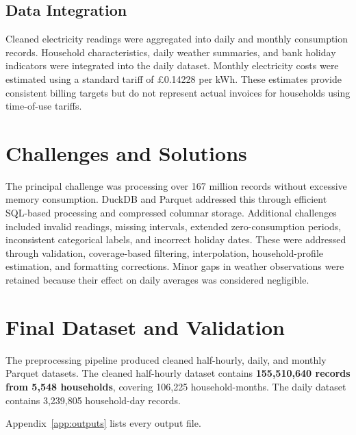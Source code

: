 \documentclass[11pt,letterpaper]{article}
\begin{document}
\subsection{Data Integration}
\label{sec:integration}

Cleaned electricity readings were aggregated into daily and monthly
consumption records. Household characteristics, daily weather summaries,
and bank holiday indicators were integrated into the daily dataset.
Monthly electricity costs were estimated using a standard tariff of
\pounds 0.14228 per kWh. These estimates provide consistent billing targets but
do not represent actual invoices for households using time-of-use
tariffs.

\section{Challenges and Solutions}
\label{sec:challenges}

The principal challenge was processing over 167 million records without
excessive memory consumption. DuckDB and Parquet addressed this through
efficient SQL-based processing and compressed columnar storage.
Additional challenges included invalid readings, missing intervals,
extended zero-consumption periods, inconsistent categorical labels, and
incorrect holiday dates. These were addressed through validation,
coverage-based filtering, interpolation, household-profile estimation,
and formatting corrections. Minor gaps in weather observations were
retained because their effect on daily averages was considered
negligible.

\section{Final Dataset and Validation}
\label{sec:final}

The preprocessing pipeline produced cleaned half-hourly, daily, and
monthly Parquet datasets. The cleaned half-hourly dataset contains
\textbf{155,510,640 records from 5,548 households}, covering 106,225
household-months. The daily dataset contains 3,239,805 household-day
records.

Appendix~\ref{app:outputs} lists every output file.
\end{document}
